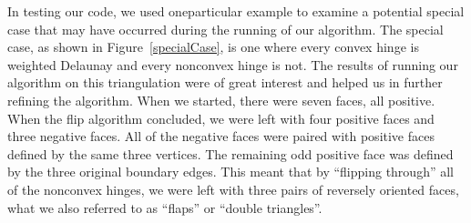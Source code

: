 \documentclass[12pt]{article}
\begin{document}
\noindent In testing our code, we used oneparticular example to examine a potential special case that may have occurred during the running of our algorithm. The special case, as shown in Figure~\ref{specialCase}, is one where every convex hinge is weighted Delaunay and every nonconvex hinge is not. The results of running our algorithm on this triangulation were of great interest and helped us in further refining the algorithm. When we started, there were seven faces, all positive. When the flip algorithm concluded, we were left with four positive faces and three negative faces. All of the negative faces were paired with positive faces defined by the same three vertices. The remaining odd positive face was defined by the three original boundary edges. This meant that by ``flipping through'' all of the nonconvex hinges, we were left with three pairs of reversely oriented faces, what we also referred to as ``flaps'' or ``double triangles''.\newline
\end{document}
